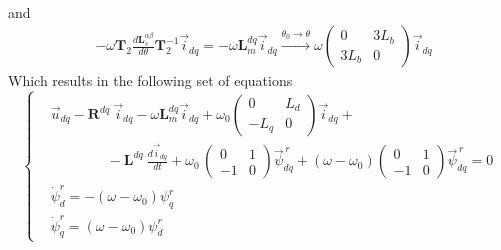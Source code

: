 \documentclass[11pt,a4paper]{article}
\numberwithin{equation}{section}
\theoremstyle{it}
\theoremstyle{definition}
\begin{document}
\begin{onehalfspace}
\begin{equation}
\begin{aligned}
	\end{aligned}
\end{equation}
and
\begin{equation}
	\begin{aligned}
		&-\omega\mathbf{T}_2\frac{d\mathbf{L}_s^{\alpha\beta}}{d\theta}\mathbf{T}_2^{-1}\vec{i}_{dq} = -\omega\mathbf{L}_m^{dq}\vec{i}_{dq}
		\xrightarrow{\theta_0\rightarrow\theta} \omega\begin{pmatrix} 0 & 3L_b\\ 3L_b & 0 \end{pmatrix}\vec{i}_{dq}\		
	\end{aligned}
\end{equation}
Which results in the following set of equations
\begin{equation*}
	\left\lbrace \begin{aligned}
		& \vec{u}_{dq}-\mathbf{R}^{dq}\ \vec{i}_{dq} -\omega\mathbf{L}_m^{dq}\vec{i}_{dq} + \omega_0\begin{pmatrix} 0 & L_d\\ -L_q & 0 \end{pmatrix}\vec{i}_{dq} + \\[6pt] &\qquad\qquad-\mathbf{L}^{dq}\ \frac{d\vec{i}_{dq}}{dt} + \omega_0\,\begin{pmatrix} 0 & 1\\ -1 & 0 \end{pmatrix}\vec{\psi}_{dq}^{\,r} + (\omega - \omega_0)\begin{pmatrix} 0 & 1\\ -1 & 0 \end{pmatrix}\vec{\psi}_{dq}^{\,r} = 0\\[6pt]
		& \dot{\psi}_d^r = -\left( \omega-\omega_0\right)\psi_q^r \\[6pt]
		&\dot{\psi}_q^r = \left( \omega-\omega_0\right)\psi_d^r
	\end{aligned} \right. 
\end{equation*}

\end{onehalfspace}
\end{document}
